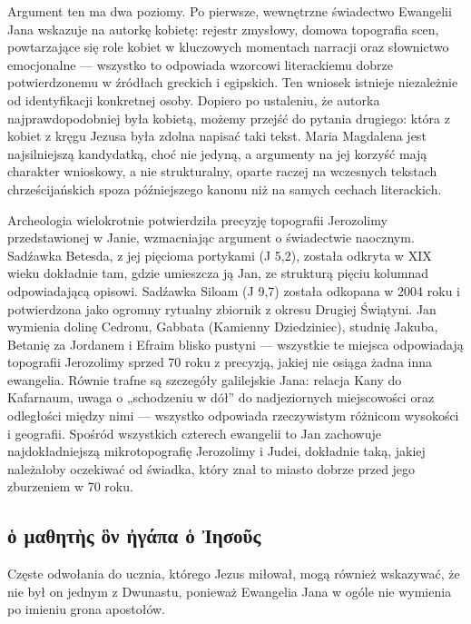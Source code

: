 Argument ten ma dwa poziomy.
Po pierwsze, wewnętrzne świadectwo Ewangelii Jana wskazuje na autorkę kobietę:
rejestr zmysłowy, domowa topografia scen, powtarzające się role kobiet w kluczowych momentach narracji oraz słownictwo emocjonalne — wszystko to odpowiada wzorcowi literackiemu dobrze potwierdzonemu w źródłach greckich i egipskich.
Ten wniosek istnieje niezależnie od identyfikacji konkretnej osoby.
Dopiero po ustaleniu, że autorka najprawdopodobniej była kobietą, możemy przejść do pytania drugiego: która z kobiet z kręgu Jezusa była zdolna napisać taki tekst.
Maria Magdalena jest najsilniejszą kandydatką, choć nie jedyną, a argumenty na jej korzyść mają charakter wnioskowy, a nie strukturalny, oparte raczej na wczesnych tekstach chrześcijańskich spoza późniejszego kanonu niż na samych cechach literackich.

Archeologia wielokrotnie potwierdziła precyzję topografii Jerozolimy przedstawionej w Janie, wzmacniając argument o świadectwie naocznym.
Sadźawka Betesda, z jej pięcioma portykami (J 5,2), została odkryta w XIX wieku dokładnie tam, gdzie umieszcza ją Jan, ze strukturą pięciu kolumnad odpowiadającą opisowi.
Sadźawka Siloam (J 9,7) została odkopana w 2004 roku i potwierdzona jako ogromny rytualny zbiornik z okresu Drugiej Świątyni.
Jan wymienia dolinę Cedronu, Gabbata (Kamienny Dziedziniec), studnię Jakuba, Betanię za Jordanem i Efraim blisko pustyni — wszystkie te miejsca odpowiadają topografii Jerozolimy sprzed 70 roku z precyzją, jakiej nie osiąga żadna inna ewangelia.
Równie trafne są szczegóły galilejskie Jana:
relacja Kany do Kafarnaum, uwaga o „schodzeniu w dół” do nadjeziornych miejscowości oraz odległości między nimi — wszystko odpowiada rzeczywistym różnicom wysokości i geografii.
Spośród wszystkich czterech ewangelii to Jan zachowuje najdokładniejszą mikrotopografię Jerozolimy i Judei, dokładnie taką, jakiej należałoby oczekiwać od świadka, który znał to miasto dobrze przed jego zburzeniem w 70 roku.

\subsection{ὁ μαθητὴς ὃν ἠγάπα ὁ Ἰησοῦς}

\label{subsec:ux1f41-ux3bcux3b1ux3b8ux3b7ux3c4ux1f74ux3c2-ux1f43ux3bd-ux1f20ux3b3ux3acux3c0ux3b1-ux1f41-ux1f30ux3b7ux3c3ux3bfux1fe6ux3c2}

Częste odwołania do ucznia, którego Jezus miłował, mogą również wskazywać, że nie był on jednym z Dwunastu, ponieważ Ewangelia Jana w ogóle nie wymienia po imieniu grona apostołów.

